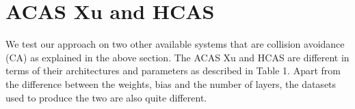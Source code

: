 










\section{ACAS Xu and HCAS}
We test our approach on two other available systems that are collision avoidance (CA) as explained in the above section. The ACAS Xu and HCAS are different in terms of their architectures and parameters as described in Table 1. Apart from the difference between the weights, bias and the number of layers, the datasets used to produce the two are also quite different.  

